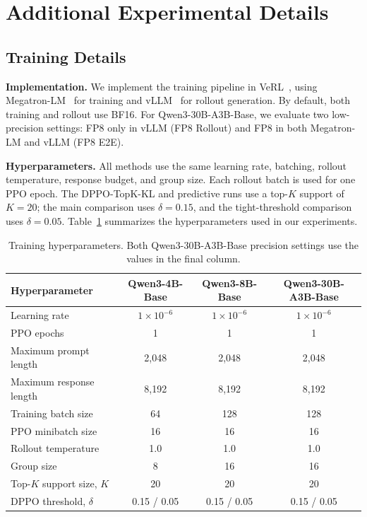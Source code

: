 \section{Additional Experimental Details}
\label{app:experiments}

\subsection{Training Details}
\label{app:training-config}

\noindent\textbf{Implementation.}
We implement the training pipeline in VeRL~\citep{sheng2024hybridflow}, using
Megatron-LM~\citep{megatron-lm} for training and vLLM~\citep{kwon2023efficient}
for rollout generation. By default, both training and rollout use BF16.
For Qwen3-30B-A3B-Base, we evaluate two low-precision settings:
FP8 only in vLLM (FP8 Rollout) and FP8 in both Megatron-LM and vLLM (FP8 E2E).

\noindent\textbf{Hyperparameters.}
All methods use the same learning rate,
batching, rollout temperature, response budget, and group size. Each rollout
batch is used for one PPO epoch. The DPPO-TopK-KL and predictive runs use a
top-$K$ support of $K=20$; the main comparison uses $\delta=0.15$, and the
tight-threshold comparison uses $\delta=0.05$. Table~\ref{tab:hyperparameters}
summarizes the hyperparameters used in our experiments.


\begin{table}[t]
    \centering
    \small
    \caption{Training hyperparameters. Both Qwen3-30B-A3B-Base precision settings use
    the values in the final column.}
    \label{tab:hyperparameters}
    \begin{tabular}{@{}lccc@{}}
    \toprule
        \textbf{Hyperparameter} & \textbf{Qwen3-4B-Base} & \textbf{Qwen3-8B-Base} & \textbf{Qwen3-30B-A3B-Base} \\
    \midrule
        Learning rate & $1\!\times\!10^{-6}$ & $1\!\times\!10^{-6}$ & $1\!\times\!10^{-6}$ \\
        PPO epochs & 1 & 1 & 1 \\
        Maximum prompt length & 2,048 & 2,048 & 2,048 \\
        Maximum response length & 8,192 & 8,192 & 8,192 \\
        Training batch size & 64 & 128 & 128 \\
        PPO minibatch size & 16 & 16 & 16 \\
        Rollout temperature & 1.0 & 1.0 & 1.0 \\
        Group size & 8 & 16 & 16 \\
        Top-$K$ support size, $K$ & 20 & 20 & 20 \\
        DPPO threshold, $\delta$ & 0.15 / 0.05 & 0.15 / 0.05 & 0.15 / 0.05 \\
    \bottomrule
    \end{tabular}
\end{table}


